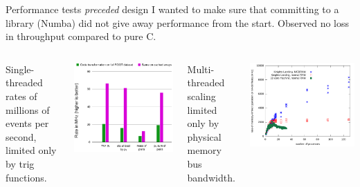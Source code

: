 \documentclass[aspectratio=169]{beamer}
\begin{document}
\begin{frame}{Performance tests {\it preceded} design}
\vspace{0.3 cm}
I wanted to make sure that committing to a library (Numba) did not give away performance from the start. Observed no loss in throughput compared to pure C.

\vspace{0.3 cm}
\begin{columns}[t]
Single-threaded rates of millions of events per second, limited only by trig functions.

\begin{center}
\includegraphics[height=5 cm]{physical-media.pdf}
\end{center}
Multi-threaded scaling limited only by physical memory bus bandwidth.

\vspace{-0.8\baselineskip}
\begin{center}
\includegraphics[height=5 cm]{knl-scaling.pdf}
\end{center}
\end{columns}
\end{frame}
\end{document}
